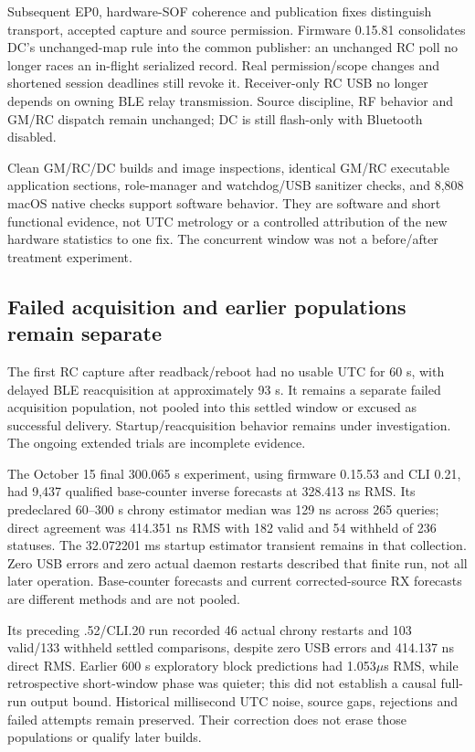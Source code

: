 \documentclass[11pt,letterpaper]{article}
\begin{document}
Subsequent EP0, hardware-SOF coherence and publication fixes distinguish transport, accepted capture and source permission. Firmware 0.15.81 consolidates DC's unchanged-map rule into the common publisher: an unchanged RC poll no longer races an in-flight serialized record. Real permission/scope changes and shortened session deadlines still revoke it. Receiver-only RC USB no longer depends on owning BLE relay transmission. Source discipline, RF behavior and GM/RC dispatch remain unchanged; DC is still flash-only with Bluetooth disabled.

Clean GM/RC/DC builds and image inspections, identical GM/RC executable application sections, role-manager and watchdog/USB sanitizer checks, and 8,808 macOS native checks support software behavior. They are software and short functional evidence, not UTC metrology or a controlled attribution of the new hardware statistics to one fix. The concurrent window was not a before/after treatment experiment.

\subsection{Failed acquisition and earlier populations remain separate}
The first RC capture after readback/reboot had no usable UTC for 60 s, with delayed BLE reacquisition at approximately 93 s. It remains a separate failed acquisition population, not pooled into this settled window or excused as successful delivery. Startup/reacquisition behavior remains under investigation. The ongoing extended trials are incomplete evidence.

The October 15 final 300.065 s experiment, using firmware 0.15.53 and CLI 0.21, had 9,437 qualified base-counter inverse forecasts at 328.413 ns RMS. Its predeclared 60--300 s chrony estimator median was 129 ns across 265 queries; direct agreement was 414.351 ns RMS with 182 valid and 54 withheld of 236 statuses. The 32.072201 ms startup estimator transient remains in that collection. Zero USB errors and zero actual daemon restarts described that finite run, not all later operation. Base-counter forecasts and current corrected-source RX forecasts are different methods and are not pooled.

Its preceding .52/CLI.20 run recorded 46 actual chrony restarts and 103 valid/133 withheld settled comparisons, despite zero USB errors and 414.137 ns direct RMS. Earlier 600 s exploratory block predictions had 1.053$\mu$s RMS, while retrospective short-window phase was quieter; this did not establish a causal full-run output bound. Historical millisecond UTC noise, source gaps, rejections and failed attempts remain preserved. Their correction does not erase those populations or qualify later builds.
\end{document}
